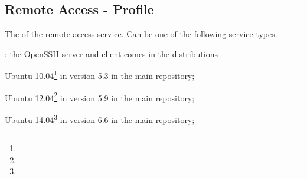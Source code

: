 \label{sec:remoteaccess_profile}
\subsection{Remote Access - Profile}


The  of the remote access service. Can be one of the following 
service types.
\begin{asparaitem}
%
\item[\qcode{openssh}:] 
the OpenSSH server and client comes in the distributions 
\begin{compactitem}
\item[\TheDistribution{ubuntu}] Ubuntu 10.04\footnote{\TheUbuntuMaverickLTSDate} in version 5.3 in the main repository;
\item[\TheDistribution{ubuntu}] Ubuntu 12.04\footnote{\TheUbuntuPreciseLTSDate} in version 5.9 in the main repository;
\item[\TheDistribution{ubuntu}] Ubuntu 14.04\footnote{\TheUbuntuTrustyLTSDate} in version 6.6 in the main repository;
\end{compactitem}
%
\end{asparaitem}

